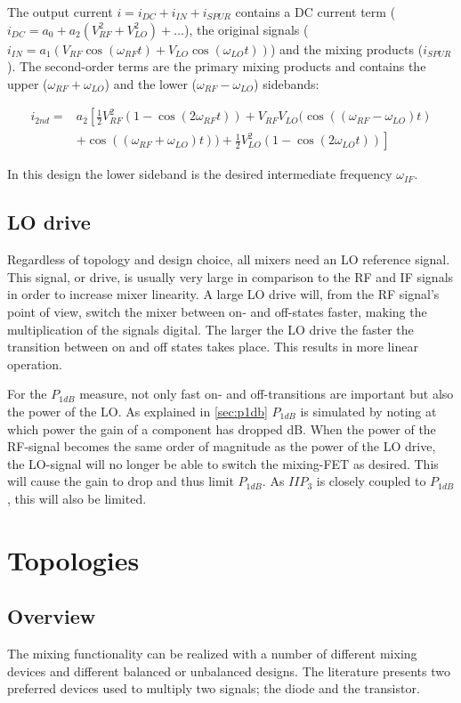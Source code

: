			The output current $i=i_{DC}+i_{IN}+i_{SPUR}$ contains a DC current term ($i_{DC} = a_0 + a_2(V_{RF}^2+V_{LO}^2)+...$), the original signals ($i_{IN}=a_1(V_{RF}\cos(\omega_{RF}t) + V_{LO}\cos(\omega_{LO}t))$) and the mixing products ($i_{SPUR}$). The second-order terms are the primary mixing products and contains the upper ($\omega_{RF}+\omega_{LO}$) and the lower ($\omega_{RF}-\omega_{LO}$) sidebands:

			\begin{align}\label{eq:mixedsecondorder}
				i_{2nd} = &a_2 \left [ \frac{1}{2}V^2_{RF}(1-\cos(2\omega_{RF}t)) + V_{RF}V_{LO}(\cos((\omega_{RF}-\omega_{LO})t) \right. \nonumber \\
				&\left. + \cos((\omega_{RF}+\omega_{LO})t)) + \frac{1}{2}V^2_{LO}(1-\cos(2\omega_{LO}t)) \right]
			\end{align}

			In this design the lower sideband is the desired intermediate frequency $\omega_{IF}$.

		\subsection{LO drive}\label{sec:mixer_lodrive}
			Regardless of topology and design choice, all mixers need an LO reference signal. This signal, or drive, is usually very large in comparison to the RF and IF signals in order to increase mixer linearity. A large LO drive will, from the RF signal's point of view, switch the mixer between on- and off-states faster, making the multiplication of the signals digital. The larger the LO drive the faster the transition between on and off states takes place. This results in more linear operation.\autocite{maas92}

			For the $P_{1dB}$ measure, not only fast on- and off-transitions are important but also the power of the LO. As explained in \autoref{sec:p1db} $P_{1dB}$ is simulated by noting at which power the gain of a component has dropped \unit[1]{dB}. When the power of the RF-signal becomes the same order of magnitude as the power of the LO drive, the LO-signal will no longer be able to switch the mixing-FET as desired. This will cause the gain to drop and thus limit $P_{1dB}$. As $IIP_3$ is closely coupled to $P_{1dB}$, this will also be limited.\autocite{kundert02}

	\section{Topologies}
		\subsection{Overview}
			The mixing functionality can be realized with a number of different mixing devices and different balanced or unbalanced designs. The literature presents two preferred devices used to multiply two signals; the diode and the transistor.\autocite{norman2002design}

